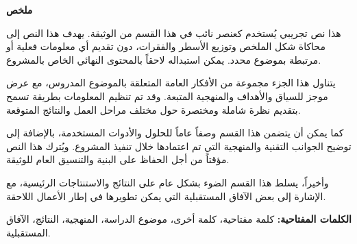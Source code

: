 \documentclass[12pt, a4paper]{article}
\begin{document}
\thispagestyle{empty}

\begin{center}
    \Huge\textbf{ملخص}
\end{center}

\vspace{1cm}

\begin{center}
\vspace{0.5cm}
\large

هذا نص تجريبي يُستخدم كعنصر نائب في هذا القسم من الوثيقة. يهدف هذا النص إلى محاكاة شكل الملخص وتوزيع الأسطر والفقرات، دون تقديم أي معلومات فعلية أو مرتبطة بموضوع محدد. يمكن استبداله لاحقاً بالمحتوى النهائي الخاص بالمشروع.\\

\vspace{0.5cm}

يتناول هذا الجزء مجموعة من الأفكار العامة المتعلقة بالموضوع المدروس، مع عرض موجز للسياق والأهداف والمنهجية المتبعة. وقد تم تنظيم المعلومات بطريقة تسمح بتقديم نظرة شاملة ومختصرة حول مختلف مراحل العمل والنتائج المتوقعة.\\

\vspace{0.5cm}

كما يمكن أن يتضمن هذا القسم وصفاً عاماً للحلول والأدوات المستخدمة، بالإضافة إلى توضيح الجوانب التقنية والمنهجية التي تم اعتمادها خلال تنفيذ المشروع. ويُترك هذا النص مؤقتاً من أجل الحفاظ على البنية والتنسيق العام للوثيقة.\\

\vspace{0.5cm}

وأخيراً، يسلط هذا القسم الضوء بشكل عام على النتائج والاستنتاجات الرئيسية، مع الإشارة إلى بعض الآفاق المستقبلية التي يمكن تطويرها في إطار الأعمال اللاحقة.\\

\vspace{1.5cm}

\textbf{الكلمات المفتاحية:} كلمة مفتاحية، كلمة أخرى، موضوع الدراسة، المنهجية، النتائج، الآفاق المستقبلية.

\end{center}
\end{document}
